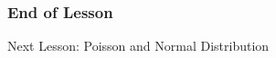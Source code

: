 \documentclass[xcolor=dvipsnames]{beamer}
\begin{document}






\begin{frame}
  \frametitle{End of Lesson}
Next Lesson: Poisson and Normal Distribution
\end{frame}
\end{document}
